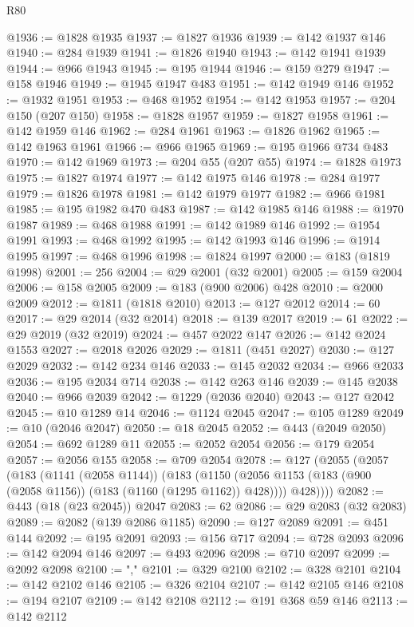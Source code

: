 \begin{lexlean}{R80}
\begin{coremodule}
@1936 := @1828 @1935
@1937 := @1827 @1936
@1939 := @142 @1937 @146
@1940 := @284 @1939
@1941 := @1826 @1940
@1943 := @142 @1941 @1939
@1944 := @966 @1943
@1945 := @195 @1944
@1946 := @159 @279
@1947 := @158 @1946
@1949 := @1945 @1947 @483
@1951 := @142 @1949 @146
@1952 := @1932 @1951
@1953 := @468 @1952
@1954 := @142 @1953
@1957 := @204 @150 (@207 @150)
@1958 := @1828 @1957
@1959 := @1827 @1958
@1961 := @142 @1959 @146
@1962 := @284 @1961
@1963 := @1826 @1962
@1965 := @142 @1963 @1961
@1966 := @966 @1965
@1969 := @195 @1966 @734 @483
@1970 := @142 @1969
@1973 := @204 @55 (@207 @55)
@1974 := @1828 @1973
@1975 := @1827 @1974
@1977 := @142 @1975 @146
@1978 := @284 @1977
@1979 := @1826 @1978
@1981 := @142 @1979 @1977
@1982 := @966 @1981
@1985 := @195 @1982 @470 @483
@1987 := @142 @1985 @146
@1988 := @1970 @1987
@1989 := @468 @1988
@1991 := @142 @1989 @146
@1992 := @1954 @1991
@1993 := @468 @1992
@1995 := @142 @1993 @146
@1996 := @1914 @1995
@1997 := @468 @1996
@1998 := @1824 @1997
@2000 := @183 (@1819 @1998)
@2001 := 256
@2004 := @29 @2001 (@32 @2001)
@2005 := @159 @2004
@2006 := @158 @2005
@2009 := @183 (@900 @2006) @428
@2010 := @2000 @2009
@2012 := @1811 (@1818 @2010)
@2013 := @127 @2012
@2014 := 60
@2017 := @29 @2014 (@32 @2014)
@2018 := @139 @2017
@2019 := 61
@2022 := @29 @2019 (@32 @2019)
@2024 := @457 @2022 @147
@2026 := @142 @2024 @1553
@2027 := @2018 @2026
@2029 := @1811 (@451 @2027)
@2030 := @127 @2029
@2032 := @142 @234 @146
@2033 := @145 @2032
@2034 := @966 @2033
@2036 := @195 @2034 @714
@2038 := @142 @263 @146
@2039 := @145 @2038
@2040 := @966 @2039
@2042 := @1229 (@2036 @2040)
@2043 := @127 @2042
@2045 := @10 @1289 @14
@2046 := @1124 @2045
@2047 := @105 @1289
@2049 := @10 (@2046 @2047)
@2050 := @18 @2045
@2052 := @443 (@2049 @2050)
@2054 := @692 @1289 @11
@2055 := @2052 @2054
@2056 := @179 @2054
@2057 := @2056 @155
@2058 := @709 @2054
@2078 := @127
    (@2055
      (@2057
        (@183
          (@1141 (@2058 @1144))
          (@183
            (@1150 (@2056 @1153 (@183 (@900 (@2058 @1156)) (@183 (@1160 (@1295 @1162)) @428))))
            @428))))
@2082 := @443 (@18 (@23 @2045)) @2047
@2083 := 62
@2086 := @29 @2083 (@32 @2083)
@2089 := @2082 (@139 @2086 @1185)
@2090 := @127 @2089
@2091 := @451 @144
@2092 := @195 @2091
@2093 := @156 @717
@2094 := @728 @2093
@2096 := @142 @2094 @146
@2097 := @493 @2096
@2098 := @710 @2097
@2099 := @2092 @2098
@2100 := ","
@2101 := @329 @2100
@2102 := @328 @2101
@2104 := @142 @2102 @146
@2105 := @326 @2104
@2107 := @142 @2105 @146
@2108 := @194 @2107
@2109 := @142 @2108
@2112 := @191 @368 @59 @146
@2113 := @142 @2112

\end{coremodule}
\end{lexlean}
